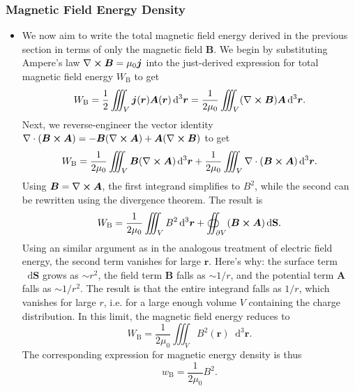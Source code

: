 \documentclass[11pt, a4paper]{article}
\newcommand{\diff}{\mathop{}\!\mathrm{d}} %
\newcommand{\dr}{\diff^{3} \r}  %
\renewcommand{\vec}[1]{\bm{#1}} %
\renewcommand{\r}{\vec{r}}
\newcommand{\B}{\vec{B}} %
\newcommand{\A}{\vec{A}} %
\renewcommand{\S}{\mathbf{S}}  %
\newcommand{\mm}{\mu_{0}}  %
\renewcommand{\j}{\vec{j}}  %
\renewcommand{\div}{\nabla \cdot}
\renewcommand{\curl}{\nabla \cross}
\begin{document}
\subsubsection{Magnetic Field Energy Density}
\begin{itemize}
    \item We now aim to write the total magnetic field energy derived in the previous section in terms of only the magnetic field $ \B $. We begin by substituting Ampere's law $ \curl \B = \mm \j $ into the just-derived expression for total magnetic field energy $ W_{\text{B}} $ to get
    \begin{equation*}
        W_{\text{B}} = \frac{1}{2} \iiint_{V} \j(\r) \A(\r) \dr = \frac{1}{2\mm}\iiint_{V}(\curl \B) \A \dr.
    \end{equation*}
    Next, we reverse-engineer the vector identity $ \div (\B \cross \A) = - \B (\curl \A) + \A (\curl \B) $ to get
    \begin{equation*}
        W_{\text{B}} = \frac{1}{2\mm} \iiint_{V} \B(\curl \A)\dr + \frac{1}{2\mm} \iiint_{V} \div (\B \cross \A) \dr.
    \end{equation*}
    Using $ \B = \curl \A $, the first integrand simplifies to $ B^{2} $, while the second can be rewritten using the divergence theorem. The result is
    \begin{equation*}
        W_{\text{B}} = \frac{1}{2\mm} \iiint_{V} B^{2} \dr + \oiint_{\partial V} (\B \cross \A) \diff \S.
    \end{equation*}
    Using an similar argument as in the analogous treatment of electric field energy, the second term vanishes for large $ \r $. Here's why: the surface term $ \diff \S $ grows as $ \sim r^{2} $, the field term $ \B $ falls as $ \sim 1/r $, and the potential term $ \A $ falls as $ \sim 1/r^{2} $. The result is that the entire integrand falls as $ 1/r $, which vanishes for large $ r $, i.e. for a large enough volume $ V $ containing the charge distribution. In this limit, the magnetic field energy reduces to
    \begin{equation*}
        W_{\text{B}} = \frac{1}{2\mm} \iiint_{V}B^{2}(\r)\dr.
    \end{equation*}
    The corresponding expression for magnetic energy density is thus
    \begin{equation*}
        w_{\text{B}} = \frac{1}{2\mm} B^{2}.
    \end{equation*}
    
    
\end{itemize}
\end{document}

